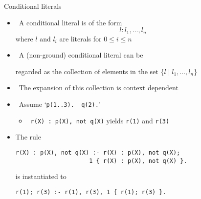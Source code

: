 \begin{frame}[fragile]{Conditional literals}
  \begin{itemize}
  \item {} \ A \alert{conditional literal} is of the form
    \[
     l:l_1,\dots, l_n
    \]
    where $l$ and $l_i$ are literals for $0\leq i\leq n$
    \medskip
  \item<only@2-3>  \
    A (non-ground) conditional literal can be

    regarded as the collection of elements in the set $\{ l\mid l_1,\dots, l_n\}$
  \item<only@3-3>[] \itarrow\ The expansion of this collection is context dependent
  \item<only@4-> \structure{Example} \ Assume `\;\verb+p(1..3).  q(2).+'
    \begin{itemize}\normalsize
    \item \ \texttt{r(X)\,:\,p(X)\!,\,not\,q(X)} \quad yields \quad \texttt{r(1)} and \texttt{r(3)}
    \end{itemize}
    \smallskip
  \item<only@5>[] The rule
\begin{lstlisting}[basicstyle=\small\ttfamily]
r(X) : p(X), not q(X) :- r(X) : p(X), not q(X);
                     1 { r(X) : p(X), not q(X) }.
\end{lstlisting}
    is instantiated to
\begin{lstlisting}[basicstyle=\small\ttfamily]
r(1); r(3) :- r(1), r(3), 1 { r(1); r(3) }.
\end{lstlisting}
  \end{itemize}
\end{frame}
%
